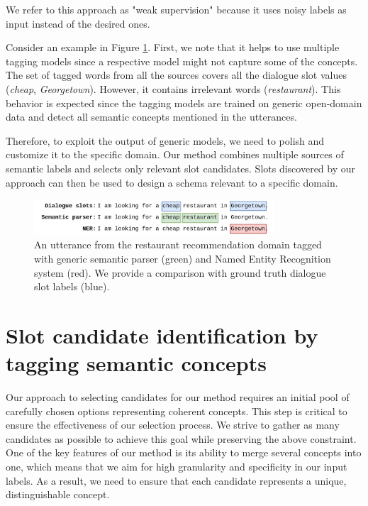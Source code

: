 We refer to this approach as "weak supervision" because it uses noisy labels as input instead of the desired ones.

Consider an example in Figure \ref{fig:tagged_example}.
First, we note that it helps to use multiple tagging models since a respective model might not capture some of the concepts.
The set of tagged words from all the sources covers all the dialogue slot values (\emph{cheap}, \emph{Georgetown}).
However, it contains irrelevant words (\emph{restaurant}).
This behavior is expected since the tagging models are trained on generic open-domain data and detect all semantic concepts mentioned in the utterances.

Therefore, to exploit the output of generic models, we need to polish and customize it to the specific domain.
Our method combines multiple sources of semantic labels and selects only relevant slot candidates.
Slots discovered by our approach can then be used to design a schema relevant to a specific domain.
\begin{figure}[h]
\centering
    \includegraphics[width=0.8\textwidth]{images/tagging-example.png}
    \caption{An utterance from the restaurant recommendation domain tagged with generic semantic parser (green) and Named Entity Recognition system (red). We provide a comparison with ground truth dialogue slot labels (blue).}
    \label{fig:tagged_example}
\end{figure}

\section{Slot candidate identification by tagging semantic concepts}
\label{04:sec:tagging_concepts}

Our approach to selecting candidates for our method requires an initial pool of carefully chosen options representing coherent concepts. This step is critical to ensure the effectiveness of our selection process. We strive to gather as many candidates as possible to achieve this goal while preserving the above constraint.
One of the key features of our method is its ability to merge several concepts into one, which means that we aim for high granularity and specificity in our input labels. As a result, we need to ensure that each candidate represents a unique, distinguishable concept.

